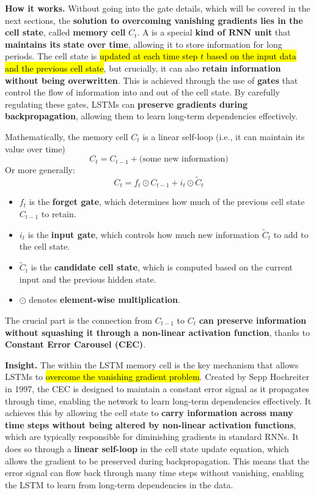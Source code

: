 \highspace
\textcolor{Green3}{ \textbf{How it works.}} Without going into the gate details, which will be covered in the next sections, the \textbf{solution to overcoming vanishing gradients lies in the cell state}, called \textbf{memory cell} $C_t$. A  is a special \textbf{kind of RNN unit} that \textbf{maintains its state over time}, allowing it to store information for long periods. The cell state is \hl{updated at each time step $t$ based on the input data and the previous cell state}, but crucially, it can also \textbf{retain information without being overwritten}. This is achieved through the use of \textbf{gates} that control the flow of information into and out of the cell state. By carefully regulating these gates, LSTMs can \textbf{preserve gradients during backpropagation}, allowing them to learn long-term dependencies effectively.

\highspace
Mathematically, the memory cell $C_t$ is a linear self-loop (i.e., it can maintain its value over time)
\begin{equation*}
    C_t = C_{t-1} + \text{(some new information)}
\end{equation*}
Or more generally:
\begin{equation}
    C_t = f_t \odot C_{t-1} + i_t \odot \tilde{C}_t
\end{equation}
\begin{itemize}
    \item $f_t$ is the \textbf{forget gate}, which determines how much of the previous cell state $C_{t-1}$ to retain.
    \item $i_t$ is the \textbf{input gate}, which controls how much new information $\tilde{C}_t$ to add to the cell state.
    \item $\tilde{C}_t$ is the \textbf{candidate cell state}, which is computed based on the current input and the previous hidden state.
    \item $\odot$ denotes \textbf{element-wise multiplication}.
\end{itemize}
The crucial part is the connection from $C_{t-1}$ to $C_t$ \textbf{can preserve information without squashing it through a non-linear activation function}, thanks to \textbf{Constant Error Carousel (CEC)}.

\highspace
\textcolor{Green3}{ \textbf{Insight.}} The  within the LSTM memory cell is the key mechanism that allows LSTMs to \hl{overcome the vanishing gradient problem}. Created by Sepp Hochreiter in 1997, the CEC is designed to maintain a constant error signal as it propagates through time, enabling the network to learn long-term dependencies effectively. It achieves this by allowing the cell state to \textbf{carry information across many time steps without being altered by non-linear activation functions}, which are typically responsible for diminishing gradients in standard RNNs. It does so through a \textbf{linear self-loop} in the cell state update equation, which allows the gradient to be preserved during backpropagation. This means that the error signal can flow back through many time steps without vanishing, enabling the LSTM to learn from long-term dependencies in the data.

